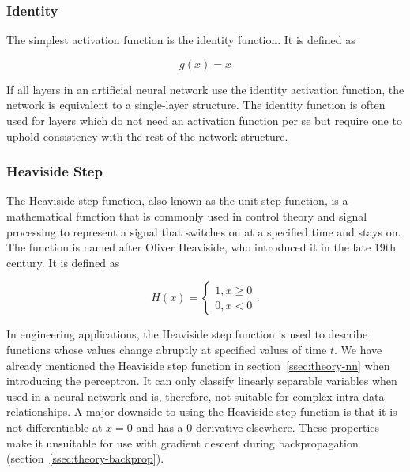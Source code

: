 \documentclass[final]{vutinfth} %
\begin{document}
\subsubsection{Identity}
\label{sssec:theory-identity}

The simplest activation function is the identity function. It is defined as

\begin{equation}
  \label{eq:identity}
  g(x) = x
\end{equation}

If all layers in an artificial neural network use the identity
activation function, the network is equivalent to a single-layer
structure. The identity function is often used for layers which do not
need an activation function per se but require one to uphold
consistency with the rest of the network structure.

\subsubsection{Heaviside Step}
\label{sssec:theory-heaviside}

The Heaviside step function, also known as the unit step function, is
a mathematical function that is commonly used in control theory and
signal processing to represent a signal that switches on at a
specified time and stays on. The function is named after Oliver
Heaviside, who introduced it in the late 19th century. It is defined
as

\begin{equation}
  \label{eq:heaviside}
  H(x) = 
  \begin{cases}
    1, x\geq 0 \\
    0, x < 0
  \end{cases}.
\end{equation}

In engineering applications, the Heaviside step function is used to
describe functions whose values change abruptly at specified values of
time $t$. We have already mentioned the Heaviside step function in
section~\ref{ssec:theory-nn} when introducing the perceptron. It can
only classify linearly separable variables when used in a neural
network and is, therefore, not suitable for complex intra-data
relationships. A major downside to using the Heaviside step function
is that it is not differentiable at $x = 0$ and has a $0$ derivative
elsewhere. These properties make it unsuitable for use with gradient
descent during backpropagation
(section~\ref{ssec:theory-backprop}).
\end{document}
